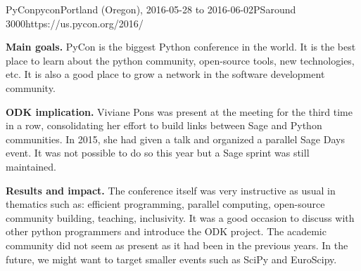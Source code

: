 \begin{event}{PyCon}{pycon}{Portland (Oregon), 2016-05-28 to 2016-06-02}{PS}{around 3000}{https://us.pycon.org/2016/}

\textbf{Main goals.} PyCon is the biggest Python conference in the world. It is the best place to learn
about the python community, open-source tools, new technologies, etc. It is also a good place
to grow a network in the software development community.

\textbf{ODK implication.} Viviane Pons was present at the meeting for the third time in a row,
consolidating her effort to build links between Sage and Python communities. In 2015, she had given
a talk and organized a parallel Sage Days event. It was not possible to do so this year but a
Sage sprint was still maintained.

\textbf{Results and impact.} The conference itself was very instructive as usual in thematics such as:
efficient programming, parallel computing, open-source community building, teaching, inclusivity. It
was a good occasion to discuss with other python programmers and introduce the ODK project. The academic
community did not seem as present as it had been in the previous years. In the future, we might want to
target smaller events such as SciPy and EuroScipy.
\end{event}